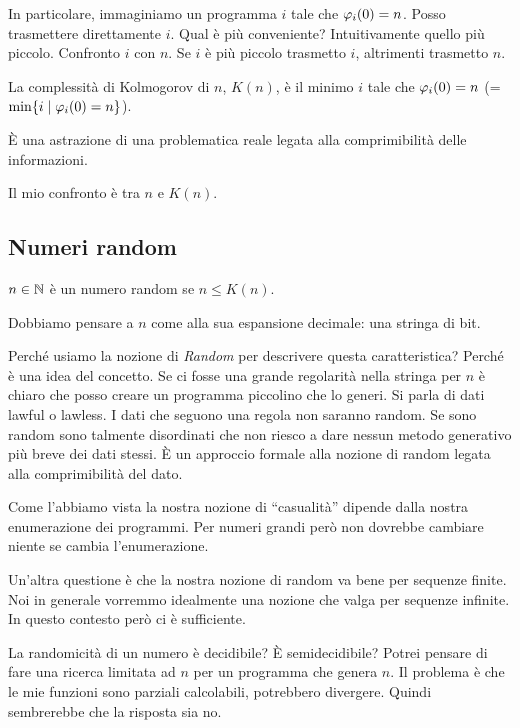 In particolare, immaginiamo un programma $i$ tale che $\varphi_{i}(0) = n$. Posso trasmettere direttamente
$i$. Qual è più conveniente? Intuitivamente quello più piccolo. Confronto $i$ con $n$. Se $i$ è più
piccolo trasmetto $i$, altrimenti trasmetto $n$.

\begin{defn}
    La complessità di Kolmogorov di $n$, $K(n)$, è il minimo $i$ tale che $\varphi_{i}(0) = n$ (=
    $\min\{i \mid \varphi_{i}(0) = n\}$).
\end{defn}

È una astrazione di una problematica reale legata alla comprimibilità delle informazioni.

Il mio confronto è tra $n$ e $K(n)$.

\subsection{Numeri random}

\begin{defn}
    $n \in \mathbb{N}$ è un numero random se $n \leq K(n)$.
\end{defn}

Dobbiamo pensare a $n$ come alla sua espansione decimale: una stringa di bit.

Perché usiamo la nozione di \textit{Random} per descrivere questa caratteristica? Perché è una
idea del concetto. Se ci fosse una grande regolarità nella stringa per $n$ è chiaro che posso creare
un programma piccolino che lo generi. Si parla di dati lawful o lawless. I dati che seguono una
regola non saranno random. Se sono random sono talmente disordinati che non riesco a dare nessun
metodo generativo più breve dei dati stessi. È un approccio formale alla nozione di random legata
alla comprimibilità del dato.

Come l'abbiamo vista la nostra nozione di ``casualità'' dipende dalla nostra enumerazione dei programmi.
Per numeri grandi però non dovrebbe cambiare niente se cambia l'enumerazione.

Un'altra questione è che la nostra nozione di random va bene per sequenze finite. Noi in generale
vorremmo idealmente una nozione che valga per sequenze infinite. In questo contesto però ci è
sufficiente.

La randomicità di un numero è decidibile? È semidecidibile? Potrei pensare di fare una ricerca
limitata ad $n$ per un programma che genera $n$. Il problema è che le mie funzioni sono parziali
calcolabili, potrebbero divergere. Quindi sembrerebbe che la risposta sia no.

